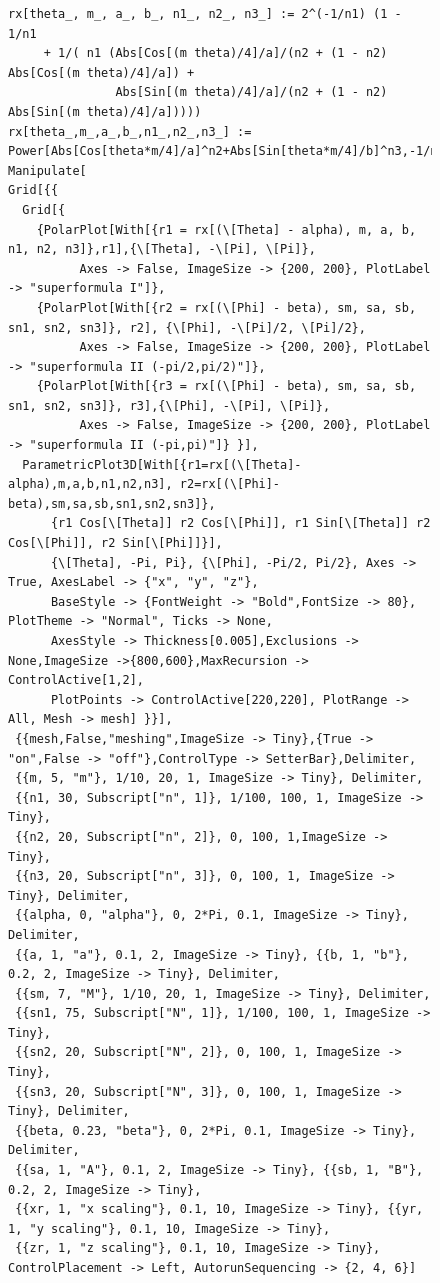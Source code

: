 \begin{figure}[htb]
{\tiny
\begin{verbatim}
rx[theta_, m_, a_, b_, n1_, n2_, n3_] := 2^(-1/n1) (1 - 1/n1
     + 1/( n1 (Abs[Cos[(m theta)/4]/a]/(n2 + (1 - n2) Abs[Cos[(m theta)/4]/a]) +
               Abs[Sin[(m theta)/4]/a]/(n2 + (1 - n2) Abs[Sin[(m theta)/4]/a]))))
rx[theta_,m_,a_,b_,n1_,n2_,n3_] := Power[Abs[Cos[theta*m/4]/a]^n2+Abs[Sin[theta*m/4]/b]^n3,-1/n1]
Manipulate[
Grid[{{
  Grid[{
    {PolarPlot[With[{r1 = rx[(\[Theta] - alpha), m, a, b, n1, n2, n3]},r1],{\[Theta], -\[Pi], \[Pi]},
          Axes -> False, ImageSize -> {200, 200}, PlotLabel -> "superformula I"]},
    {PolarPlot[With[{r2 = rx[(\[Phi] - beta), sm, sa, sb, sn1, sn2, sn3]}, r2], {\[Phi], -\[Pi]/2, \[Pi]/2},
          Axes -> False, ImageSize -> {200, 200}, PlotLabel -> "superformula II (-pi/2,pi/2)"]},
    {PolarPlot[With[{r3 = rx[(\[Phi] - beta), sm, sa, sb, sn1, sn2, sn3]}, r3],{\[Phi], -\[Pi], \[Pi]},
          Axes -> False, ImageSize -> {200, 200}, PlotLabel -> "superformula II (-pi,pi)"]} }],
  ParametricPlot3D[With[{r1=rx[(\[Theta]-alpha),m,a,b,n1,n2,n3], r2=rx[(\[Phi]-beta),sm,sa,sb,sn1,sn2,sn3]},
      {r1 Cos[\[Theta]] r2 Cos[\[Phi]], r1 Sin[\[Theta]] r2 Cos[\[Phi]], r2 Sin[\[Phi]]}],
      {\[Theta], -Pi, Pi}, {\[Phi], -Pi/2, Pi/2}, Axes -> True, AxesLabel -> {"x", "y", "z"},
      BaseStyle -> {FontWeight -> "Bold",FontSize -> 80}, PlotTheme -> "Normal", Ticks -> None,
      AxesStyle -> Thickness[0.005],Exclusions -> None,ImageSize ->{800,600},MaxRecursion -> ControlActive[1,2],
      PlotPoints -> ControlActive[220,220], PlotRange -> All, Mesh -> mesh] }}],
 {{mesh,False,"meshing",ImageSize -> Tiny},{True -> "on",False -> "off"},ControlType -> SetterBar},Delimiter,
 {{m, 5, "m"}, 1/10, 20, 1, ImageSize -> Tiny}, Delimiter,
 {{n1, 30, Subscript["n", 1]}, 1/100, 100, 1, ImageSize -> Tiny},
 {{n2, 20, Subscript["n", 2]}, 0, 100, 1,ImageSize -> Tiny},
 {{n3, 20, Subscript["n", 3]}, 0, 100, 1, ImageSize -> Tiny}, Delimiter,
 {{alpha, 0, "alpha"}, 0, 2*Pi, 0.1, ImageSize -> Tiny}, Delimiter,
 {{a, 1, "a"}, 0.1, 2, ImageSize -> Tiny}, {{b, 1, "b"}, 0.2, 2, ImageSize -> Tiny}, Delimiter,
 {{sm, 7, "M"}, 1/10, 20, 1, ImageSize -> Tiny}, Delimiter,
 {{sn1, 75, Subscript["N", 1]}, 1/100, 100, 1, ImageSize -> Tiny},
 {{sn2, 20, Subscript["N", 2]}, 0, 100, 1, ImageSize -> Tiny},
 {{sn3, 20, Subscript["N", 3]}, 0, 100, 1, ImageSize -> Tiny}, Delimiter,
 {{beta, 0.23, "beta"}, 0, 2*Pi, 0.1, ImageSize -> Tiny}, Delimiter,
 {{sa, 1, "A"}, 0.1, 2, ImageSize -> Tiny}, {{sb, 1, "B"}, 0.2, 2, ImageSize -> Tiny},
 {{xr, 1, "x scaling"}, 0.1, 10, ImageSize -> Tiny}, {{yr, 1, "y scaling"}, 0.1, 10, ImageSize -> Tiny},
 {{zr, 1, "z scaling"}, 0.1, 10, ImageSize -> Tiny}, ControlPlacement -> Left, AutorunSequencing -> {2, 4, 6}]


\end{verbatim}}
\end{figure}
